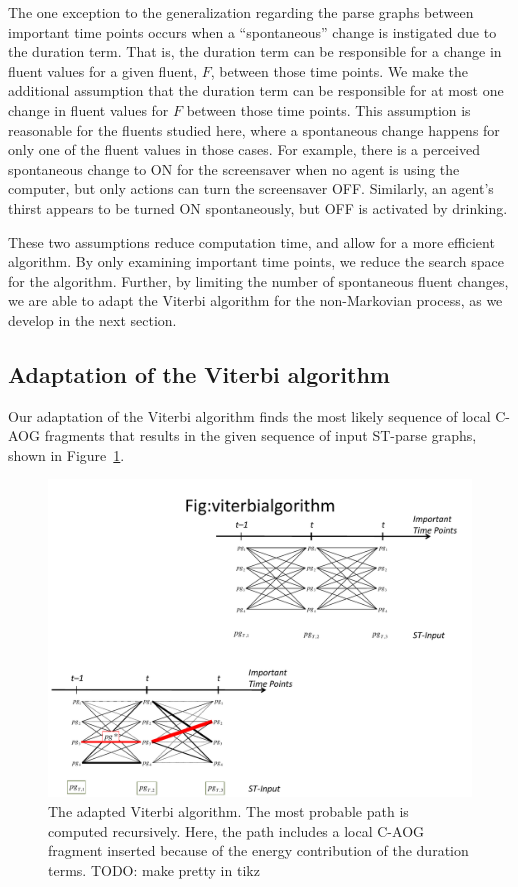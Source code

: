 \documentclass[10pt,journal,letterpaper,compsoc]{IEEEtran}
\begin{document}
The one exception to the generalization regarding the parse graphs  between important time points occurs when a ``spontaneous'' change is instigated due to the duration term.  That is, the duration term can be responsible for a change in fluent values for a given fluent, $F$, between those time points.  We make the additional assumption that the duration term can be responsible for at most one change in fluent values for $F$ between those time points.  This assumption is reasonable for the fluents studied here, where a spontaneous change happens for only one of the fluent values in those cases.  For example, there is a perceived spontaneous change to ON for the screensaver when no agent is using the computer, but only actions can turn the screensaver OFF.  Similarly, an agent's thirst appears to be turned ON spontaneously, but OFF is activated by drinking.

These two assumptions reduce computation time, and allow for a more efficient algorithm.  By only examining important time points, we reduce the search space for the algorithm.  Further, by limiting the number of spontaneous fluent changes, we are able to adapt the Viterbi algorithm for the non-Markovian process, as we develop in the next section.



\subsection{Adaptation of the Viterbi algorithm}


Our adaptation of the Viterbi algorithm finds the most likely sequence of local C-AOG fragments that results in the given sequence of input ST-parse graphs, shown in Figure~\ref{fig:viterbialgorithm}.

\begin{figure}[htp]
\centering
\includegraphics[trim = 0in 0in 4.25in 4.5in, clip, width=.9\linewidth]{viterbialgorithm.pdf}
\caption{The adapted Viterbi algorithm.  The most probable path is computed recursively.  Here, the path includes a local C-AOG fragment inserted because of the energy contribution of the duration terms.  %
TODO: make pretty in tikz
\label{fig:viterbialgorithm}}
\end{figure}
\end{document}
